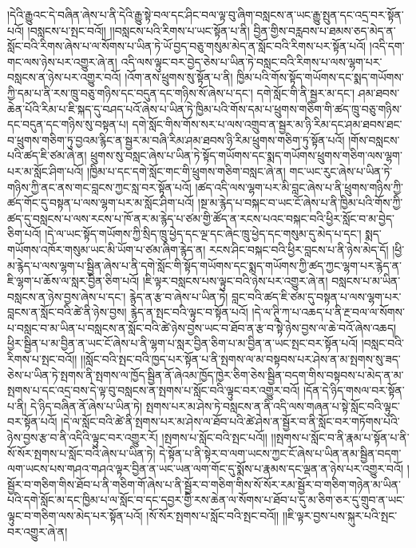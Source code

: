 །དེའི་རྒྱུའང་དེ་བཞིན་ཞེས་པ་ནི་དེའི་རྒྱུ་སྟེ་བལ་དང་ཤིང་བལ་ལྟ་བུ་ཞིག་བསླངས་ན་ཡང་རྒྱུ་སྤུན་དང་འདྲ་བར་སྟོན་པའོ། །བསླངས་པ་སྤང་བའོ།། །།བསླངས་པའི་རིགས་པ་ཡང་སྟོན་པ་ནི། བྱིན་གྱིས་བརླབས་པ་ཐམས་ཅད་མེད་ན་སློང་བའི་རིགས་ཞེས་པ་ལ་སོགས་པ་ཡིན་ཏེ་ཡོ་བྱད་བཅུ་གསུམ་མེད་ན་སློང་བའི་རིགས་པར་སྟོན་པའོ། །འདི་དག་གང་ལས་ཉེས་པར་འགྱུར་ཞེ་ན། འདི་ལས་ལྟུང་བར་བྱེད་ཅེས་པ་ཡིན་ཏེ་བསླང་བའི་རིགས་པ་ལས་ལྷག་པར་བསླངས་ན་ཉེས་པར་འགྱུར་བའོ། །འོག་ནས་ཕྲུགས་སུ་སྟོན་པ་ནི། ཁྱིམ་པའི་གོས་སྟོད་གཡོགས་དང་སྨད་གཡོགས་ཀྱི་དམ་པ་ནི་རས་ཁྲུ་བཅུ་གཉིས་དང་བདུན་དང་གཉིས་སོ་ཞེས་པ་དང་། དགེ་སློང་གི་ནི་སྦྱར་མ་དང་། ཤམ་ཐབས་ཆེན་པོའི་རིམ་པ་ཇི་སྐད་དུ་བཤད་པའོ་ཞེས་པ་ཡིན་ཏེ་ཁྱིམ་པའི་གོས་དམ་པ་ཕྲུགས་གཅིག་གི་ཚད་ཁྲུ་བཅུ་གཉིས་དང་བདུན་དང་གཉིས་སུ་བསྟན་པ། དགེ་སློང་གིས་གོས་སར་པ་ལས་འགྲུབ་ན་སྦྱར་མ་ཉི་རིམ་དང་ཤམ་ཐབས་ཐང་བ་ཕྲུགས་གཅིག་ཏུ་བྱའམ་རྙིང་ན་སྦྱར་མ་བཞི་རིམ་ཤམ་ཐབས་ཉི་རིམ་ཕྲུགས་གཅིག་ཏུ་སྟོན་པའོ། །གོས་བསླངས་པའི་ཚད་ཇི་ཙམ་ཞེ་ན། ཕྲུགས་སུ་བསླང་ཞེས་པ་ཡིན་ཏེ་སྟོད་གཡོགས་དང་སྨད་གཡོགས་ཕྲུགས་གཅིག་ལས་ལྷག་པར་མ་སློང་ཤིག་པའོ། །ཁྱིམ་པ་དང་དགེ་སློང་གང་གི་ཕྲུགས་གཅིག་བསླང་ཞེ་ན། གང་ཡང་རུང་ཞེས་པ་ཡིན་ཏེ་གཉིས་ཀྱི་ནང་ནས་གང་བླངས་ཀྱང་སླ་བར་སྟོན་པའོ། །ཚད་འདི་ལས་ལྷག་པར་མི་བླང་ཞེས་པ་ནི་ཕྲུགས་གཉིས་ཀྱི་ཚད་གོང་དུ་བསྟན་པ་ལས་ལྷག་པར་མ་སློང་ཤིག་པའོ། །སྔ་མ་རྙེད་པ་བསྐང་བ་ཡང་ངོ་ཞེས་པ་ནི་ཁྱིམ་པའི་གོས་ཀྱི་ཚད་དུ་བསླངས་པ་ལས་རངས་པ་ཁོ་ནར་མ་རྙེད་པ་ཙམ་གྱི་ཚོད་ན་རངས་པའང་བསྐང་བའི་ཕྱིར་སློང་བ་མ་བྱེད་ཅིག་པའོ། །དེ་ལ་ཡང་སྟོད་གཡོགས་ཀྱི་སྲིད་ཁྲུ་ཕྱེད་དང་ལྔ་དང་ཞེང་ཁྲུ་ཕྱེད་དང་གསུམ་དུ་མེད་པ་དང་། སྨད་གཡོགས་འཁོར་གསུམ་ཡང་མི་ཡོག་པ་ཙམ་ཞིག་རྙེད་ན། རངས་ཤིང་བསྐང་བའི་ཕྱིར་བླངས་པ་ནི་ཉེས་མེད་དོ། །ཕྱི་མ་རྙེད་པ་ལས་ལྷག་པ་སྦྱིན་ཞེས་པ་ནི་དགེ་སློང་གི་སྟོད་གཡོགས་དང་སྨད་གཡོགས་ཀྱི་ཚད་ཀྱང་ལྷག་པར་རྙེད་ན་ཇི་ལྷག་པ་ཆོས་ལ་སླར་བྱིན་ཅིག་པའོ། །ཇི་ལྟར་བསླངས་པས་ལྟུང་བའི་ཉེས་པར་འགྱུར་ཞེ་ན། བསླངས་པ་མ་ཡིན་བསླངས་ན་ཉེས་བྱས་ཞེས་པ་དང་། རྙེད་ན་རྩ་བ་ཞེས་པ་ཡིན་ཏེ། བླང་བའི་ཚད་ཇི་ཙམ་དུ་བསྟན་པ་ལས་ལྷག་པར་བླངས་ན་སློང་བའི་ཚེ་ནི་ཉེས་བྱས། རྙེད་ན་སྤང་བའི་ལྟུང་བ་སྟོན་པའོ། །དེ་ལ་ཊཱི་ཀ་པ་འཆད་པ་ནི་རྔ་བལ་ལ་སོགས་པ་བསླང་བ་མ་ཡིན་པ་བསླངས་ན་སློང་བའི་ཚེ་ཉེས་བྱས་ཡང་བ་ཐོབ་ན་རྩ་བ་སྟེ་ཉེས་བྱས་ལ་ཆེ་བའོ་ཞེས་འཆད། ཕྱིར་སྦྱིན་པ་མ་བྱིན་ན་ཡང་ངོ་ཞེས་པ་ནི་ལྷག་པ་སླར་བྱིན་ཅིག་པ་མ་བྱིན་ན་ཡང་སྤང་བར་སྟོན་པའོ། །བསླང་བའི་རིགས་པ་སྤང་བའོ།། །།སློང་བའི་སྤང་བའི་ཁྱད་པར་སྟོན་པ་ནི་སྤགས་ལ་མ་བསྟབས་པར་ཤེས་ན་མ་སྤགས་སུ་ཟད་ཅེས་པ་ཡིན་ཏེ་སྤགས་ནི་སྤགས་ལ་ཁྱོད་སྦྱིན་ནོ་ཞེའམ་ཁྱོད་ཁྱེར་ཅིག་ཅེས་སྦྱིན་བདག་གིས་བསྟབས་པ་མེད་ན་མ་སྤགས་པ་དང་འདྲ་བས་དེ་ལྟ་བུ་བསླངས་ན་སྤགས་པ་སློང་བའི་ལྟུང་བར་འགྱུར་བའོ། །དོན་དེ་ཉིད་གསལ་བར་སྟོན་པ་ནི། དེ་ཉིད་བཞིན་ནོ་ཞེས་པ་ཡིན་ཏེ། སྤགས་པར་མ་ཤེས་ཏེ་བསླངས་ན་ནི་འདི་ལས་གཞན་པ་སྟེ་སློང་བའི་ལྟུང་བར་སྟོན་པའོ། །དེ་ལ་སློང་བའི་ཚེ་ནི་སྤགས་པར་མ་ཤེས་ལ་ཐོབ་པའི་ཚེ་ཤེས་ན་སྦྱོར་བ་ནི་སློང་བར་གཏོགས་པའི་ཉེས་བྱས་རྩ་བ་ནི་འདིའི་ལྟུང་བར་འགྱུར་རོ། །སྤགས་པ་སློང་བའི་སྤང་པའོ།། །།སྤགས་པ་སློང་བ་ནི་རྣམ་པ་སྟོན་པ་ནི་སོ་སོར་སྤགས་པ་སློང་བའི་ཞེས་པ་ཡིན་ཏེ། དེ་སྟོན་པ་ནི་སྟེར་བ་ལག་ཡངས་ཀྱང་ངོ་ཞེས་པ་ཡིན་ནམ་སྦྱིན་བདག་ལག་ཡངས་པས་གཤའ་གཤའ་ལྟར་བྱིན་ན་ཡང་ཡན་ལག་གོང་དུ་སྨོས་པ་རྣམས་དང་ལྡན་ན་ཉེས་པར་འགྱུར་བའོ། །སྦྱོར་བ་གཅིག་གིས་ཐོབ་པ་ནི་གཅིག་གོ་ཞེས་པ་ནི་སྦྱོར་བ་གཅིག་གིས་སོ་སོར་རམ་སྦྱོར་བ་གཅིག་གཉེན་མ་ཡིན་པའི་དགེ་སློང་མ་དང་ཁྱིམ་པ་ལ་སློང་བ་དང་དབྱར་གྱི་རས་ཆེན་ལ་སོགས་པ་ཐོབ་པ་དུ་མ་ཅིག་ཅར་དུ་གྲུབ་ན་ཡང་ལྟུང་བ་གཅིག་ལས་མེད་པར་སྟོན་པའོ། །སོ་སོར་སྤགས་པ་སློང་བའི་སྤང་བའོ།། །།ཇི་ལྟར་བྱས་པས་སྐུར་པའི་སྤང་བར་འགྱུར་ཞེ་ན། 